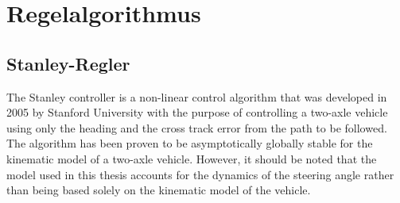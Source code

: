 \documentclass[arbeit=studie,oneside,BCOR=12mm]{ArbeitRST}
\begin{document}
\chapter{Regelalgorithmus}

\section{Stanley-Regler}
%
%
%

The Stanley controller is a non-linear control algorithm that was developed in
2005 by Stanford University with the purpose of controlling a two-axle vehicle
using only the heading and the cross track error from the path to be followed.
The algorithm has been proven to be asymptotically globally stable for the
kinematic model of a two-axle vehicle. However, it should be noted that the
model used in this thesis accounts for the dynamics of the steering angle
rather than being based solely on the kinematic model of the vehicle.
\end{document}
